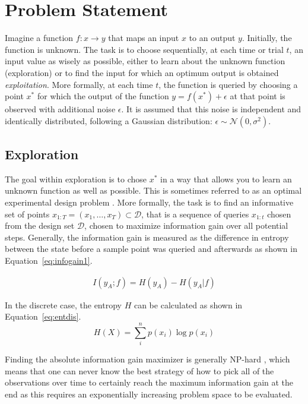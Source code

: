 \documentclass[authoryear,11pt,review]{elsarticle}
\begin{document}
\section{Problem Statement}
Imagine a function $f: x \rightarrow y$ that maps an input $x$ to an output $y$. Initially, the function is unknown. The task is to choose sequentially, at each time or trial $t$, an input value as wisely as possible, either to learn about the unknown function (exploration) or to find the input for which an optimum output is obtained \emph{exploitation}. More formally, at each time $t$, the function is queried by choosing a point $x^*$ for which the output of the function $y=f(x^*)+\epsilon$ at that point is observed with additional noise $\epsilon$. It is assumed that this noise is independent and identically distributed, following a Gaussian distribution: $\epsilon \sim \mathcal{N}(0,\sigma^2)$.

\subsection{Exploration}
The goal within exploration is to chose $x^*$ in a way that allows you to learn an unknown function as well as possible. This is sometimes referred to as an optimal experimental design problem \citep{goos2011optimal}. More formally, the task is to find an informative set of points $x_{1:T} = (x_1,\ldots,x_T) \subset \mathcal{D}$, that is a sequence of queries $x_{1:t}$ chosen from the design set $\mathcal{D}$, chosen to maximize information gain over all potential steps. Generally, the information gain is measured as the difference in entropy between the state before a sample point was queried and afterwards as shown in Equation~\ref{eq:infogain1}.

\begin{align}
\label{eq:infogain1}
 I(y_{A};f)=H(y_{A})-H(y_{A}|f)
\end{align}

In the discrete case, the entropy $H$ can be calculated as shown in Equation~\ref{eq:entdis}.
\begin{equation*}
\label{eq:entdis}
H(X)=\sum_i^n p(x_i) \log p(x_i)
\end{equation*}

Finding the absolute information gain maximizer is generally NP-hard \citep{ko1995exact}, which means that one can never know the best strategy of how to pick all of the observations over time to certainly reach the maximum information gain at the end as this requires an exponentially increasing problem space to be evaluated. 
\end{document}
